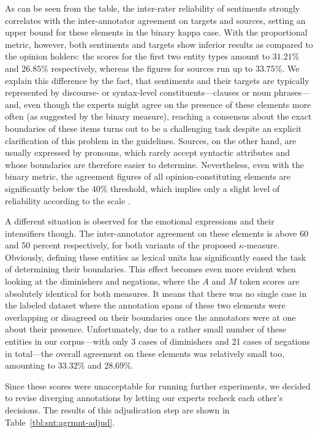 As can be seen from the table, the inter-rater reliability of
sentiments strongly correlates with the inter-annotator agreement on
targets and sources, setting an upper bound for these elements in the
binary kappa case.  With the proportional metric, however, both
sentiments and targets show inferior results as compared to the
opinion holders: the scores for the first two entity types amount to
$31.21\%$ and $26.85\%$ respectively, whereas the figures for sources
run up to $33.75\%$.  We explain this difference by the fact, that
sentiments and their targets are typically represented by discourse-
or syntax-level constituents---clauses or noun phrases---and, even
though the experts might agree on the presence of these elements more
often (as suggested by the binary measure), reaching a consensus about
the exact boundaries of these items turns out to be a challenging task
despite an explicit clarification of this problem in the guidelines.
Sources, on the other hand, are usually expressed by pronouns, which
rarely accept syntactic attributes and whose boundaries are therefore
easier to determine.  Nevertheless, even with the binary metric, the
agreement figures of all opinion-constituting elements are
significantly below the $40\%$ threshold, which implies only a slight
level of reliability according to the \citeauthor{Landis:77} scale
\cite{Landis:77}.

A different situation is observed for the emotional expressions and
their intensifiers though.  The inter-annotator agreement on these
elements is above 60 and 50 percent respectively, for both variants of
the proposed $\kappa$-measure.  Obviously, defining these entities as
lexical units has significantly eased the task of determining their
boundaries.  This effect becomes even more evident when looking at the
diminishers and negations, where the $A$ and $M$ token scores are
absolutely identical for both measures.  It means that there was no
single case in the labeled dataset where the annotation spans of these
two elements were overlapping or disagreed on their boundaries once
the annotators were at one about their presence.  Unfortunately, due
to a rather small number of these entities in our corpus---with only
3 cases of diminishers and 21 cases of negations in total---the
overall agreement on these elements was relatively small too,
amounting to $33.32\%$ and $28.69\%$.

Since these scores were unacceptable for running further experiments,
we decided to revise diverging annotations by letting our experts
recheck each other's decisions.
The results of this adjudication step are shown in
Table~\ref{tbl:snt:agrmnt-adjud}.

